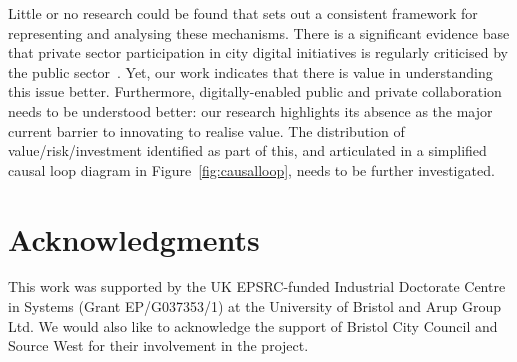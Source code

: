 \documentclass[b5paper,10pt]{article}
\begin{document}
Little or no research could be found that sets out a consistent
framework for representing and analysing these mechanisms. There is a
significant evidence base that private sector participation in city
digital initiatives is regularly criticised by the public
sector~\citep{martin:2016}. Yet, our work indicates that there is
value in understanding this issue better. Furthermore,
digitally-enabled public and private collaboration needs to be
understood better: our research highlights its absence as the major
current barrier to innovating to realise value. The distribution of
value/risk/investment identified as part of this, and articulated in a
simplified causal loop diagram in Figure~\ref{fig:causalloop}, needs
to be further investigated.

\section*{Acknowledgments}

This work was supported by the UK EPSRC-funded Industrial Doctorate
Centre in Systems (Grant EP/G037353/1) at the University of Bristol
and Arup Group Ltd. We would also like to acknowledge the support of
Bristol City Council and Source West for their involvement in the
project.




\end{document}
